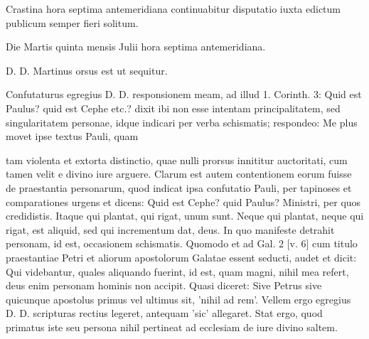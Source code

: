 Crastina hora septima antemeridiana continuabitur disputatio iuxta edictum publicum semper fieri solitum.

Die Martis quinta mensis Julii hora septima antemeridiana.

D. D. Martinus orsus est ut sequitur.

Confutaturus egregius D. D. responsionem meam, ad illud 1. Corinth. 3: Quid est Paulus? quid est Cephe etc.? dixit ibi non esse intentam principalitatem, sed singularitatem personae, idque indicari per verba schismatis; respondeo: Me plus movet ipse textus Pauli, quam

tam violenta et extorta distinctio, quae nulli prorsus innititur auctoritati, cum tamen velit e divino iure arguere. Clarum est autem contentionem eorum fuisse de praestantia personarum, quod indicat ipsa confutatio Pauli, per tapinoses et comparationes urgens et dicens: Quid est Cephe? quid Paulus? Ministri, per quos credidistis. Itaque qui plantat, qui rigat, unum sunt. Neque qui plantat, neque qui rigat, est aliquid, sed qui incrementum dat, deus. In quo manifeste detrahit personam, id est, occasionem schismatis. Quomodo et ad Gal. 2 [v. 6] cum titulo praestantiae Petri et aliorum apostolorum Galatae essent seducti, audet et dicit: Qui videbantur, quales aliquando fuerint, id est, quam magni, nihil mea refert, deus enim personam hominis non accipit. Quasi diceret: Sive Petrus sive quicunque apostolus primus vel ultimus sit, 'nihil ad rem'. Vellem ergo egregius D. D. scripturas rectius legeret, antequam 'sic' allegaret. Stat ergo, quod primatus iste seu persona nihil pertineat ad ecclesiam de iure divino saltem.

